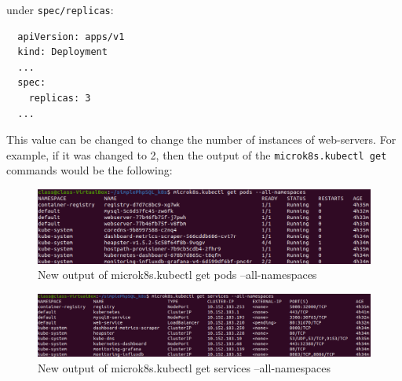 \documentclass[11pt]{article}
\begin{document}
under \verb|spec/replicas|:
\begin{verbatim}
  apiVersion: apps/v1
  kind: Deployment
  ...
  spec:
    replicas: 3
  ...
\end{verbatim}
This value can be changed to change the number of instances of web-servers. For example, if it was changed to 2,
then the output of the \verb|microk8s.kubectl get| commands would be the following:
\begin{figure}[htbp]
  \centering
  \includegraphics[width=1\linewidth]{./get_pods_2.png}
  \caption{\label{fig:pods2}
  New output of microk8s.kubectl get pods --all-namespaces}
\end{figure}
\begin{figure}[htbp]
  \centering
  \includegraphics[width=1\linewidth]{./get_services_2.png}
  \caption{\label{fig:svcs2}
  New output of microk8s.kubectl get services --all-namespaces}
\end{figure}
\end{document}
